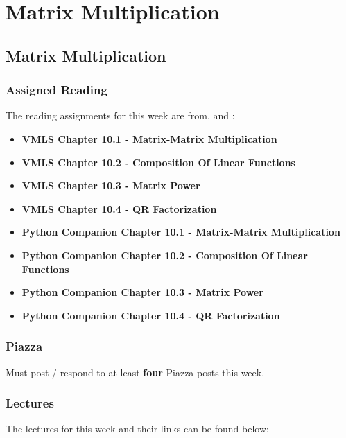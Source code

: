 \clearpage

\renewcommand{\ChapTitle}{Matrix Multiplication}
\renewcommand{\SectionTitle}{Matrix Multiplication}

\chapter{\ChapTitle}
\section{\SectionTitle}

\subsection{Assigned Reading}

The reading assignments for this week are from, \VMLS \hspace*{1pt} and \PyCap:

\begin{itemize}
    \item \textbf{VMLS Chapter 10.1 - Matrix-Matrix Multiplication}
    \item \textbf{VMLS Chapter 10.2 - Composition Of Linear Functions}
    \item \textbf{VMLS Chapter 10.3 - Matrix Power}
    \item \textbf{VMLS Chapter 10.4 - QR Factorization}
    \item \textbf{Python Companion Chapter 10.1 - Matrix-Matrix Multiplication}
    \item \textbf{Python Companion Chapter 10.2 - Composition Of Linear Functions}
    \item \textbf{Python Companion Chapter 10.3 - Matrix Power}
    \item \textbf{Python Companion Chapter 10.4 - QR Factorization}
\end{itemize}

\subsection{Piazza}

Must post / respond to at least \textbf{four} Piazza posts this week.

\subsection{Lectures}

The lectures for this week and their links can be found below:

